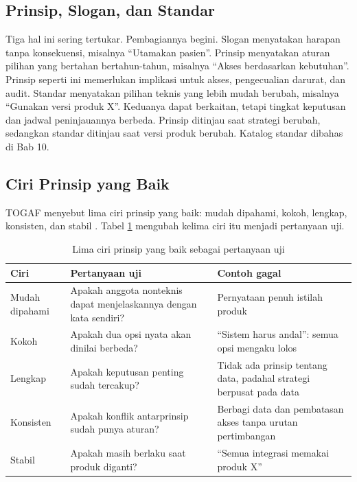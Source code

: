 \subsection*{Prinsip, Slogan, dan Standar}

Tiga hal ini sering tertukar. Pembagiannya begini. Slogan menyatakan harapan tanpa
konsekuensi, misalnya ``Utamakan pasien''. Prinsip menyatakan aturan pilihan yang
bertahan bertahun-tahun, misalnya ``Akses berdasarkan kebutuhan''. Prinsip seperti
ini memerlukan implikasi untuk akses, pengecualian darurat, dan audit. Standar
menyatakan pilihan teknis yang lebih mudah berubah, misalnya ``Gunakan versi produk
X''. Keduanya dapat berkaitan, tetapi tingkat keputusan dan jadwal peninjauannya
berbeda. Prinsip ditinjau saat strategi berubah, sedangkan standar ditinjau saat
versi produk berubah. Katalog standar dibahas di Bab 10.

\subsection*{Ciri Prinsip yang Baik}

TOGAF menyebut lima ciri prinsip yang baik: mudah dipahami, kokoh, lengkap,
konsisten, dan stabil \cite{togaf10}. Tabel \ref{tab:ch03-kriteria-prinsip}
mengubah kelima ciri itu menjadi pertanyaan uji.

\begin{table}[!htb]
  \centering
  \caption{Lima ciri prinsip yang baik sebagai pertanyaan uji}
  \label{tab:ch03-kriteria-prinsip}
  \footnotesize
  \begin{tabularx}{\textwidth}{>{\raggedright\arraybackslash}p{1.7cm}*{2}{>{\raggedright\arraybackslash}X}}
    \hline
    \textbf{Ciri} & \textbf{Pertanyaan uji} & \textbf{Contoh gagal} \\
    \hline
    Mudah dipahami & Apakah anggota nonteknis dapat menjelaskannya dengan kata sendiri? & Pernyataan penuh istilah produk \\
    \hline
    Kokoh & Apakah dua opsi nyata akan dinilai berbeda? & ``Sistem harus andal'': semua opsi mengaku lolos \\
    \hline
    Lengkap & Apakah keputusan penting sudah tercakup? & Tidak ada prinsip tentang data, padahal strategi berpusat pada data \\
    \hline
    Konsisten & Apakah konflik antarprinsip sudah punya aturan? & Berbagi data dan pembatasan akses tanpa urutan pertimbangan \\
    \hline
    Stabil & Apakah masih berlaku saat produk diganti? & ``Semua integrasi memakai produk X'' \\
    \hline
  \end{tabularx}
\end{table}

